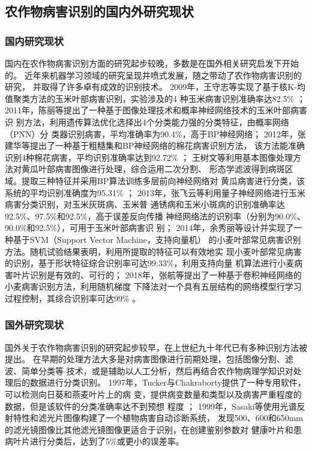 \subsection{\hei\xiaosan\textbf{农作物病害识别的国内外研究现状}}
  \subsubsection{\hei\sihao\textbf{国内研究现状}}
    国内在农作物病害识别方面的研究起步较晚，多数是在国外相关研究启发下开始的。
    近年来机器学习领域的研究呈现井喷式发展，随之带动了农作物病害识别的研究，
    并取得了许多卓有成效的识别技术。
    2009年，王守志等实现了基于核K-均值聚类方法的玉米叶部病害识别，实验涉及的4
    种玉米病害识别准确率达82.5\% \cite{王守志2009基于核}；
    2011年，陈丽等提出了一种基于图像处理技术和概率神经网络技术的玉米叶部病害识
    别方法，利用遗传算法优化选择出4个分类能力强的分类特征，由概率网络（PNN）分
    类器识别病害，平均准确率为90.4\%，高于BP神经网络\cite{陈丽2011概率神经网络在玉米叶部病害识别中的应用}；
    2012年，张建华等提出了一种基于粗糙集和BP神经网络的棉花病害识别方法，
    该方法能准确识别4种棉花病害，平均识别准确率达到92.72\% \cite{张建华2012基于粗糙集和}；
    王树文等利用基本图像处理方法对黄瓜叶部病害图像进行处理，综合运用二次分割、
    形态学滤波得到病斑区域。提取三种特征并采用BP算法训练多层前向神经网络对
    黄瓜病害进行分类，该系统的平均识别准确度为95.31\% \cite{王树文2012基于图像处理技术的黄瓜叶片病害识别诊断系统研究}；
    2013年，张飞云等利用量子神经网络进行玉米病害分类识别，对玉米灰斑病、玉米普
    通锈病和玉米小斑病的识别准确率达92.5\%、97.5\%和92.5\%，高于误差反向传播
    神经网络法的识别率（分别为90.0\%、90.0\%和92.5\%），可用于玉米叶部病害识
    别\cite{张飞云2013基于量子神经网络和组合特征参数的玉米叶部病害识别}；
    2014年，余秀丽等设计并实现了一种基于SVM（Support Vector Machine，支持向量机）
    的小麦叶部常见病害识别方法。随机试验结果表明，利用所提取的特征可以有效地实
    现小麦叶部常见病害的识别，基于形状特征综合识别率可达99.33\%，利用支持向量
    机算法进行小麦病害叶片识别是有效的、可行的\cite{余秀丽2014基于}；
    2018年，张航等提出了一种基于卷积神经网络的小麦病害识别方法，利用随机梯度
    下降法对一个具有五层结构的网络模型行学习过程控制，其综合识别率可达99\% 
    \cite{张航2018一种基于卷积神经网络的小麦病害识别方法}。

  \subsubsection{\hei\sihao\textbf{国外研究现状}}
    国外关于农作物病害识别的研究起步较早，在上世纪九十年代已有多种识别方法被提出。
    在早期的处理方法大多是对病害图像进行前期处理，包括图像分割、滤波、简单分类等
    技术，或是辅助以人工分析，然后再结合农作物病理学知识对处理后的数据进行分类识别。
    1997年，Tucker与Chakraborty提供了一种专用软件，可以检测向日葵和燕麦叶片上的病
    变，提供病变数量和类型以及病害严重程度的数据，但是该软件的分类准确率达不到预想
    程度 \cite{tucker1997quantitative}；
    1999年，Sasaki等使用光谱反射特性和滤光片图像构建了一个植物病害自动诊断系统，
    发现500、600和650mm的滤光镜图像比其他滤光镜图像更适合于识别，在创建鉴别参数对
    健康叶片和患病叶片进行分类后，达到了5\%或更小的误差率\cite{sasaki1999automatic}。

